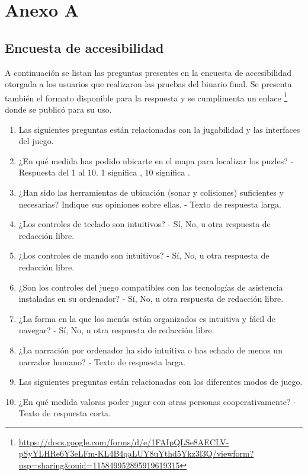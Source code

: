 \chapter*{Anexo A}
\section*{Encuesta de accesibilidad}
A continuación se listan las preguntas presentes en la encuesta de accesibilidad otorgada a los usuarios que realizaron las pruebas del binario final. Se presenta también el formato disponible para la respuesta y se cumplimenta un enlace \footnote{ \url{https://docs.google.com/forms/d/e/1FAIpQLSe8AECLV-pSyYLHRe6Y3eLFm-KL4B4qaLUY8uYthd5Ykz3l3Q/viewform?usp=sharing&ouid=115849952895919619315}} donde se publicó para su uso.
\begin{enumerate}
	\item[$\blacksquare$] Las siguientes preguntas están relacionadas con la jugabilidad y las interfaces del juego.
	\item ¿En qué medida has podido ubicarte en el mapa para localizar los puzles?
	\subitem- Respuesta del 1 al 10. 1 significa , 10 significa .
	\item ¿Han sido las herramientas de ubicación (sonar y colisiones) suficientes y necesarias? Indique sus opiniones sobre ellas.
	\subitem- Texto de respuesta larga.
	\item ¿Los controles de teclado son intuitivos?
	\subitem- Sí, No, u otra respuesta de redacción libre.
	\item ¿Los controles de mando son intuitivos?
	\subitem- Sí, No, u otra respuesta de redacción libre.
	\item ¿Son los controles del juego compatibles con las tecnologías de asistencia instaladas en su ordenador?
	\subitem- Sí, No, u otra respuesta de redacción libre.
	\item ¿La forma en la que los menús están organizados es intuitiva y fácil de navegar?
	\subitem- Sí, No, u otra respuesta de redacción libre.
	\item ¿La narración por ordenador ha sido intuitiva o has echado de menos un narrador humano?
	\subitem- Texto de respuesta larga.
	\item[$\blacksquare$] Las siguientes preguntas están relacionadas con los diferentes modos de juego.
	\item ¿En qué medida valoras poder jugar con otras personas cooperativamente?
	\subitem- Texto de respuesta corta.

\end{enumerate}

